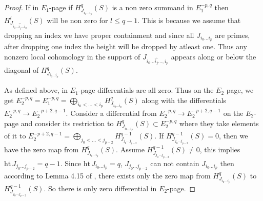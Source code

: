 \documentclass[10pt]{amsart}
\theoremstyle{plain}
\theoremstyle{definition}
\newcommand{\func}[1]{\mathrm{#1} \,}
\newcommand{\height}{\func{ht}}
\begin{document}
\begin{proof}
If in $E_1$-page if $H^q_{J_{i_0\ldots i_p}}(S)$ is a non zero summand in $E_1^{-p,q}$ then $H^l_{J_{i_0\ldots\widehat{i_j}\ldots i_p}}(S)$ will be non zero for $l\leq q-1$. This is because we assume that dropping an index we have proper containment and since all $J_{i_0\ldots i_p}$ are primes, after dropping one index the height will be dropped by atleast one. Thus any nonzero local cohomology in the support of $J_{i_0\ldots\widehat{i_j}\ldots,i_p}$ appears along or below the diagonal of $H^q_{J_{i_0\ldots i_p}}(S)$.

As defined above, in $E_1$-page differentials are all zero. Thus on the $E_2$ page, we get $E_2^{-p,q}= E_1^{-p,q}=\bigoplus_{i_0<\dots<i_p}H^q_{J_{i_0\ldots i_p}}(S)$ along with the differentials $E_2^{-p,q}\to E_2^{-p+2,q-1}$. Consider a differential from $E_2^{-p,q}\to E_2^{-p+2,q-1}$ on the $E_2$-page and consider its restriction to $H^q_{J_{i_0\ldots i_p}}(S)\subset E_2^{-p,q}$ where they take elements of it to $E_2^{-p+2,q-1}=\bigoplus_{j_0<\dots<j_{p-2}}H^{q-1}_{J_{j_0\ldots j_{p-2}}}(S)$. If $H^{q-1}_{J_{j_0\ldots j_{p-2}}}(S)= 0$, then we have the zero map from $H^q_{J_{i_0\ldots i_p}}(S)$. Assume $H^{q-1}_{J_{j_0\ldots j_{p-2}}}(S)\neq 0$, this implies $\height J_{j_0\ldots j_{p-2}}= q-1$. Since $\height J_{i_0\ldots i_p}= q$, $J_{j_0\ldots j_{p-2}}$ can not contain $J_{i_0\ldots i_p}$ then according to Lemma 4.15 of \cite{ABZ}, there exists only the zero map from $H^q_{J_{i_0\ldots i_p}}(S)$ to $H^{q-1}_{J_{j_0\ldots j_{p-2}}}(S)$. So there is only zero differential in $E_2$-page.  
 


\end{proof}
\end{document}
